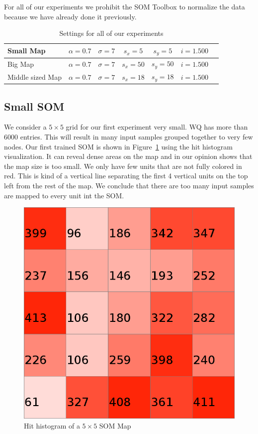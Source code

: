 \documentclass{acm_proc_article-sp}
\begin{document}
For all of our experiments we prohibit the SOM Toolbox to normalize the data because we have
already done it previously.

\begin{table}
\centering
\begin{tabular}{|l|c|c|c|c|c|c|}
    \hline
    Small Map & $\alpha = 0.7$ & $\sigma = 7$ & $s_x=5$ & $s_y=5$ & $i=1.500$ \\
    \hline
    Big Map & $\alpha = 0.7$ & $\sigma = 7$ & $s_x=50$ & $s_y=50$ & $i=1.500$ \\
    \hline
    Middle sized Map & $\alpha = 0.7$ & $\sigma = 7$ & $s_x=18$ & $s_y=18$ & $i=1.500$ \\
    \hline
\end{tabular}
\caption{Settings for all of our experiments}
\label{tab:settings}
\end{table}

\subsection{Small SOM}

We consider a $5\times5$ grid for our first experiment very small. WQ has more than 6000 entries.
This will result in many input samples grouped together to very few nodes. Our first trained
SOM is shown in Figure~\ref{fig:wine-small-hit-histogram} using the hit histogram visualization.
It can reveal dense areas on the map and in our opinion shows that the map size is too small.
We only have few units that are not fully colored in red. This is kind of a vertical line separating
the first 4 vertical units on the top left from the rest of the map. We conclude that there are
too many input samples are mapped to every unit int the SOM.

\begin{figure}
\centering
\includegraphics[width=0.5\linewidth]{img/wine-small-hit-histogram}
\caption{Hit histogram of a $5\times5$ SOM Map}
\label{fig:wine-small-hit-histogram}
\end{figure}
\end{document}
